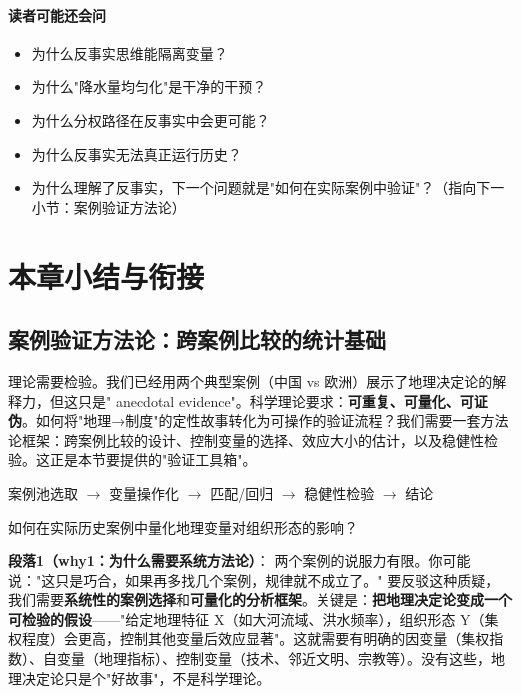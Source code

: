 \documentclass[../main.tex]{subfiles}
\begin{document}
\paragraph*{读者可能还会问}
\begin{itemize}
\item 为什么反事实思维能隔离变量？
\item 为什么"降水量均匀化"是干净的干预？
\item 为什么分权路径在反事实中会更可能？
\item 为什么反事实无法真正运行历史？
\item 为什么理解了反事实，下一个问题就是"如何在实际案例中验证"？（指向下一小节：案例验证方法论）
\end{itemize}

	\section{本章小结与衔接}
	
	\subsection{案例验证方法论：跨案例比较的统计基础}

\begin{motivation}
	理论需要检验。我们已经用两个典型案例（中国 vs 欧洲）展示了地理决定论的解释力，但这只是" anecdotal evidence"。科学理论要求：\textbf{可重复、可量化、可证伪}。如何将"地理→制度"的定性故事转化为可操作的验证流程？我们需要一套方法论框架：跨案例比较的设计、控制变量的选择、效应大小的估计，以及稳健性检验。这正是本节要提供的"验证工具箱"。
\end{motivation}

\begin{logicmap}
	案例池选取 $\rightarrow$ 变量操作化 $\rightarrow$ 匹配/回归 $\rightarrow$ 稳健性检验 $\rightarrow$ 结论
\end{logicmap}

\begin{questionbox}
	如何在实际历史案例中量化地理变量对组织形态的影响？
\end{questionbox}

	
	\textbf{段落1（why1：为什么需要系统方法论）}：  
两个案例的说服力有限。你可能说："这只是巧合，如果再多找几个案例，规律就不成立了。" 要反驳这种质疑，我们需要\textbf{系统性的案例选择}和\textbf{可量化的分析框架}。关键是：\textbf{把地理决定论变成一个可检验的假设}——"给定地理特征 X（如大河流域、洪水频率），组织形态 Y（集权程度）会更高，控制其他变量后效应显著"。这就需要有明确的因变量（集权指数）、自变量（地理指标）、控制变量（技术、邻近文明、宗教等）。没有这些，地理决定论只是个"好故事"，不是科学理论。
\end{document}
